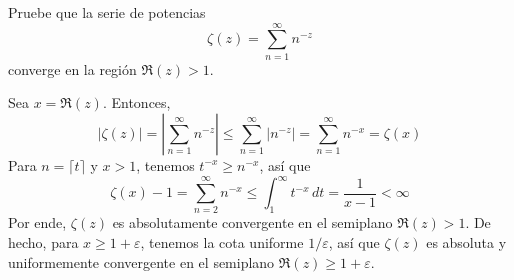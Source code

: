 \begin{exercise}
Pruebe que la serie de potencias
$$\zeta(z) = \sum_{n=1}^\infty n^{-z}$$
converge en la región $\Re(z) > 1$.
\end{exercise}

\begin{solution}
Sea $x = \Re(z)$. Entonces,
$$
|\zeta(z)|
    = \left| \sum_{n=1}^\infty n^{-z} \right|
    \le \sum_{n=1}^\infty \left| n^{-z} \right|
    = \sum_{n=1}^\infty n^{-x}
    = \zeta(x)
$$
Para $n = \lceil t \rceil$ y $x > 1$, tenemos $t^{-x} \ge n^{-x}$, así que
$$
\zeta(x) - 1
    = \sum_{n=2}^\infty n^{-x}
    \le \int_1^\infty t^{-x} \, dt
    = \frac 1 {x-1}
    < \infty
$$
Por ende, $\zeta(z)$ es absolutamente convergente en el semiplano $\Re(z) > 1$. De hecho, para $x \ge 1 + \varepsilon$, tenemos la cota uniforme $1/\varepsilon$, así que $\zeta(z)$ es absoluta y uniformemente convergente en el semiplano $\Re(z) \ge 1 + \varepsilon$.
\end{solution}
